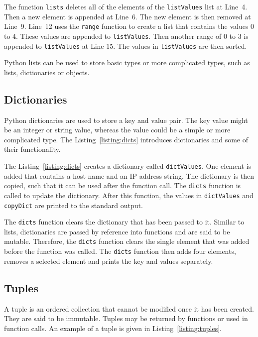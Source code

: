 \documentclass[11pt,a4paper]{article}
\begin{document}


The function \texttt{lists} deletes all of the elements of the \texttt{listValues} list at Line~4.  Then a new element is appended at Line~6.  The new element is then removed at Line~9.  Line~12 uses the \texttt{range} function to create a list that contains the values 0 to 4.  These values are appended to \texttt{listValues}.  Then another range of 0 to 3 is appended to \texttt{listValues} at Line 15.  The values in \texttt{listValues} are then sorted.

Python lists can be used to store basic types or more complicated types, such as lists, dictionaries or objects.

\subsection{Dictionaries}

Python dictionaries are used to store a key and value pair.  The key value might be an integer or string value, whereas the value could be a simple or more complicated type.  The Listing~\ref{listing:dicts} introduces dictionaries and some of their functionality.



The Listing~\ref{listing:dicts} creates a dictionary called \texttt{dictValues}.  One element is added that contains a host name and an IP address string.  The dictionary is then copied, such that it can be used after the function call.  The \texttt{dicts} function is called to update the dictionary.  After this function, the values in \texttt{dictValues} and \texttt{copyDict} are printed to the standard output.

The \texttt{dicts} function clears the dictionary that has been passed to it.  Similar to lists, dictionaries are passed by reference into functions and are said to be mutable.  Therefore, the \texttt{dicts} function clears the single element that was added before the function was called.  The \texttt{dicts} function then adds four elements, removes a selected element and prints the key and values separately.

\subsection{Tuples}

A tuple is an ordered collection that cannot be modified once it has been created.  They are said to be immutable.  Tuples may be returned by functions or used in function calls.  An example of a tuple is given in Listing~\ref{listing:tuples}.
\end{document}
